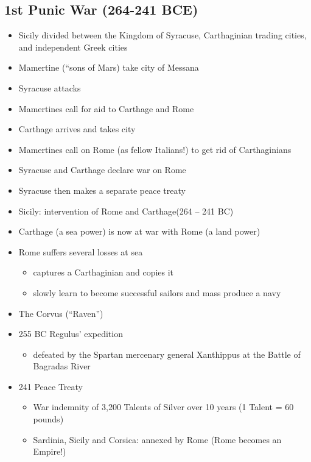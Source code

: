 \documentclass[12pt, twoside]{article}
\begin{document}
\subsection{1st Punic War (264-241 BCE)}
\begin{itemize}
\item Sicily divided between the Kingdom of Syracuse, Carthaginian trading cities, and independent Greek cities
\item Mamertine (“sons of Mars) take city of Messana
\item Syracuse attacks
\item Mamertines call for aid to Carthage and Rome
\item Carthage arrives and takes city
\item Mamertines call on Rome (as fellow Italians!) to get rid of Carthaginians
\item Syracuse and Carthage declare war on Rome
\item Syracuse then makes a separate peace treaty
\item Sicily: intervention of Rome and Carthage(264 – 241 BC)
\item Carthage (a sea power) is now at war with Rome (a land power)
\item Rome suffers several losses at sea
	\begin{itemize}
	\item captures a Carthaginian and copies it
	\item slowly learn to become successful sailors and mass produce a navy
	\end{itemize}
\item The Corvus (“Raven”)
\item 255 BC Regulus' expedition
	\begin{itemize}
	\item defeated by the Spartan mercenary general Xanthippus at the Battle of Bagradas River
	\end{itemize}
\item 241 Peace Treaty
	\begin{itemize}	
	\item War indemnity of 3,200 Talents of Silver over 10 years (1 Talent = 60 pounds)
	\item Sardinia, Sicily and Corsica: annexed by Rome (Rome becomes an Empire!)
	\end{itemize}
\end{itemize}
\end{document}
